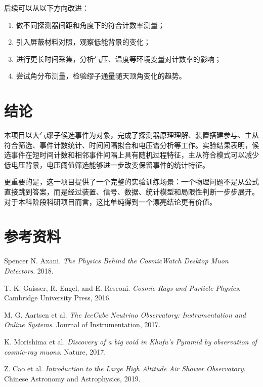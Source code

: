 \documentclass[11pt,a4paper]{ctexart}
\begin{document}
后续可以从以下方向改进：

\begin{enumerate}
  \item 做不同探测器间距和角度下的符合计数率测量；
  \item 引入屏蔽材料对照，观察低能背景的变化；
  \item 进行更长时间采集，分析气压、温度等环境变量对计数率的影响；
  \item 尝试角分布测量，检验缪子通量随天顶角变化的趋势。
\end{enumerate}

\section{结论}

本项目以大气缪子候选事件为对象，完成了探测器原理理解、装置搭建参与、主从符合筛选、事件计数统计、时间间隔拟合和电压谱分析等工作。实验结果表明，候选事件在短时间计数和相邻事件间隔上具有随机过程特征，主从符合模式可以减少低电压背景，电压阈值筛选能够进一步改变保留事件的统计特征。

更重要的是，这一项目提供了一个完整的实验训练场景：一个物理问题不是从公式直接跳到答案，而是经过装置、信号、数据、统计模型和局限性判断一步步展开。对于本科阶段科研项目而言，这比单纯得到一个漂亮结论更有价值。

\section*{参考资料}

\begin{enumerate}[label={[\arabic*]}]
  \item Spencer N. Axani. \textit{The Physics Behind the CosmicWatch Desktop Muon Detectors}. 2018.
  \item T. K. Gaisser, R. Engel, and E. Resconi. \textit{Cosmic Rays and Particle Physics}. Cambridge University Press, 2016.
  \item M. G. Aartsen et al. \textit{The IceCube Neutrino Observatory: Instrumentation and Online Systems}. Journal of Instrumentation, 2017.
  \item K. Morishima et al. \textit{Discovery of a big void in Khufu's Pyramid by observation of cosmic-ray muons}. Nature, 2017.
  \item Z. Cao et al. \textit{Introduction to the Large High Altitude Air Shower Observatory}. Chinese Astronomy and Astrophysics, 2019.
\end{enumerate}
\end{document}
